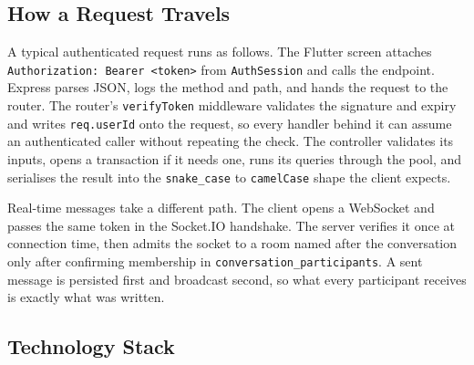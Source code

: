 \documentclass{tietreport}
\begin{document}
\subsection{How a Request Travels}

A typical authenticated request runs as follows. The Flutter screen attaches
\texttt{Authorization: Bearer <token>} from \texttt{AuthSession} and calls the
endpoint. Express parses JSON, logs the method and path, and hands the request to the
router. The router's \texttt{verifyToken} middleware validates the signature and
expiry and writes \texttt{req.userId} onto the request, so every handler behind it can
assume an authenticated caller without repeating the check. The controller validates
its inputs, opens a transaction if it needs one, runs its queries through the pool,
and serialises the result into the \texttt{snake\_case} to \texttt{camelCase} shape the
client expects.

Real-time messages take a different path. The client opens a WebSocket and passes the
same token in the Socket.IO handshake. The server verifies it once at connection time,
then admits the socket to a room named after the conversation only after confirming
membership in \texttt{conversation\_\allowbreak participants}. A sent message is persisted first and
broadcast second, so what every participant receives is exactly what was written.

\subsection{Technology Stack}
\end{document}
